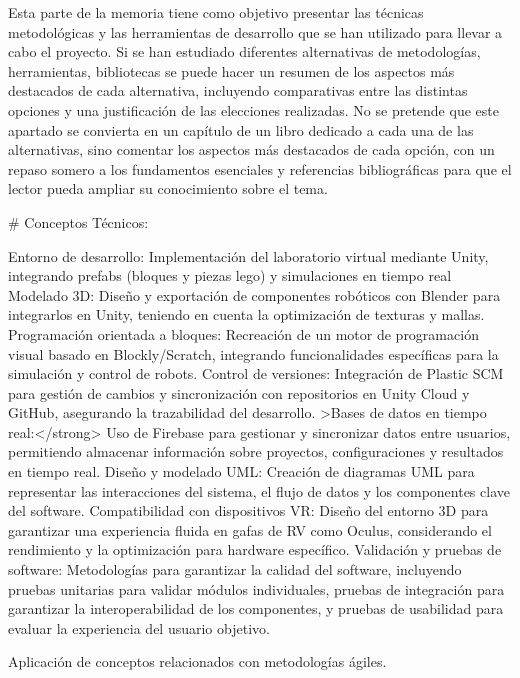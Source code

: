 
Esta parte de la memoria tiene como objetivo presentar las técnicas metodológicas y las herramientas de desarrollo que se han utilizado para llevar a cabo el proyecto. Si se han estudiado diferentes alternativas de metodologías, herramientas, bibliotecas se puede hacer un resumen de los aspectos más destacados de cada alternativa, incluyendo comparativas entre las distintas opciones y una justificación de las elecciones realizadas. 
No se pretende que este apartado se convierta en un capítulo de un libro dedicado a cada una de las alternativas, sino comentar los aspectos más destacados de cada opción, con un repaso somero a los fundamentos esenciales y referencias bibliográficas para que el lector pueda ampliar su conocimiento sobre el tema.


# Conceptos Técnicos:

Entorno de desarrollo: Implementación del laboratorio virtual mediante Unity, integrando prefabs (bloques y piezas lego) y simulaciones en tiempo real
Modelado 3D: Diseño y exportación de componentes robóticos con Blender para integrarlos en Unity, teniendo en cuenta la optimización de texturas y mallas.
Programación orientada a bloques: Recreación de un motor de programación visual basado en Blockly/Scratch, integrando funcionalidades específicas para la simulación y control de robots.
Control de versiones: Integración de Plastic SCM para gestión de cambios y sincronización con repositorios en Unity Cloud y GitHub, asegurando la trazabilidad del desarrollo.
>Bases de datos en tiempo real:</strong> Uso de Firebase para gestionar y sincronizar datos entre usuarios, permitiendo almacenar información sobre proyectos, configuraciones y resultados en tiempo real.
Diseño y modelado UML: Creación de diagramas UML para representar las interacciones del sistema, el flujo de datos y los componentes clave del software.
Compatibilidad con dispositivos VR: Diseño del entorno 3D para garantizar una experiencia fluida en gafas de RV como Oculus, considerando el rendimiento y la optimización para hardware específico.
Validación y pruebas de software: Metodologías para garantizar la calidad del software, incluyendo pruebas unitarias para validar módulos individuales, pruebas de integración para garantizar la interoperabilidad de los componentes, y pruebas de usabilidad para evaluar la experiencia del usuario objetivo.

Aplicación de conceptos relacionados con metodologías ágiles.


